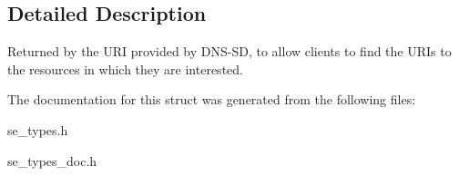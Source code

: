 \subsection{Detailed Description}
Returned by the U\+RI provided by D\+N\+S-\/\+SD, to allow clients to find the U\+R\+Is to the resources in which they are interested. 

The documentation for this struct was generated from the following files\+:\begin{DoxyCompactItemize}
\item 
se\+\_\+types.\+h\item 
se\+\_\+types\+\_\+doc.\+h\end{DoxyCompactItemize}
